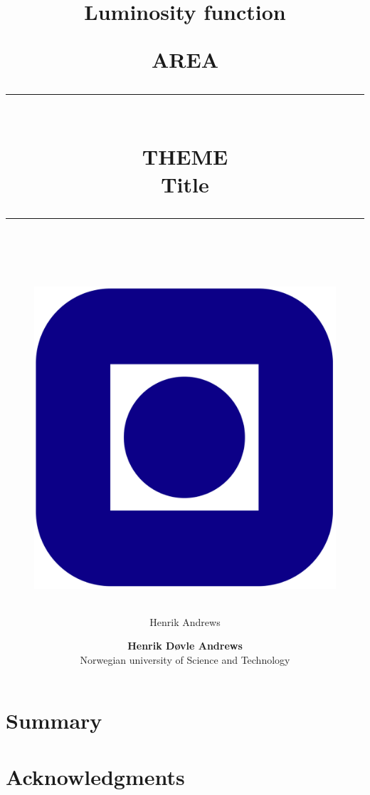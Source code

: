 \documentclass{article}
\title{Luminosity function}
\author{Henrik Andrews}
\newcommand{\HRule}[1]{\rule{\linewidth}{#1}}
\begin{document}
\title{ \normalsize \textsc{AREA}
	\\ [2.0cm]
	\HRule{0.5pt} \\
	\LARGE \textbf{\uppercase{Theme}}		
	\\ Title\\
	\HRule{2pt} \\ [0.5cm]		
	\vspace{6cm}
	\begin{figure}[htp]
    \centering
    \includegraphics[width=.2\textwidth]{Logo-Ntnu.svg.png}
    \end{figure}
	}

\author{
    \normalsize 
	\textbf{Henrik Døvle Andrews } \\
	Norwegian university of Science and Technology \\ 
}

\maketitle
\setcounter{page}{ 0 }

\newpage

\pagestyle{fancy}
\fancyhf{}
\setlength\headheight{12pt}
\setcounter{page}{1}


\maketitle

\begin{abstract}
\lipsum[1] %
\end{abstract}

\newpage 
\section*{Summary}
\lipsum[2] %

\newpage
\section*{Acknowledgments}
\lipsum[3] %
\end{document}

